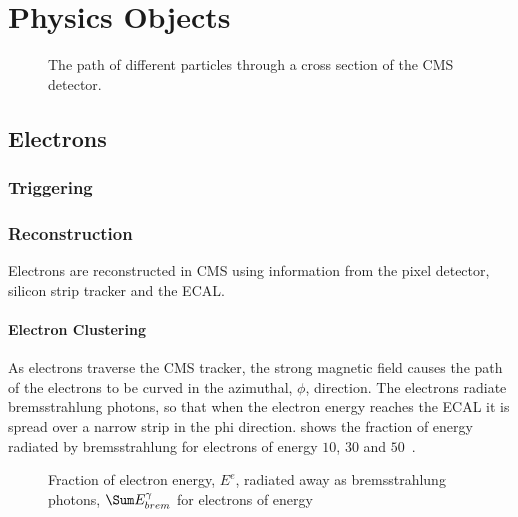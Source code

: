 \chapter{Physics Objects}


\begin{figure}[htb]
  \centering
  \caption{The path of different particles through a cross section of the CMS detector.}
  \label{phob:crosssec}
\end{figure}

\section{Electrons}

\subsection{Triggering}

\subsection{Reconstruction}
Electrons are reconstructed in CMS using information from the pixel detector,
silicon strip tracker and the ECAL.

\subsubsection{Electron Clustering}
As electrons traverse the CMS tracker, the strong magnetic field causes the path
of the electrons to be curved in the azimuthal, $\phi$, direction. The electrons
radiate bremsstrahlung photons, so that when the electron energy reaches the
ECAL it is spread over a narrow strip in the phi direction.
 shows the fraction of energy radiated by bremsstrahlung for
electrons of energy $10$, $30$ and \unit{$50$}{\GeV}.

\begin{figure}[htb]
  \centering
  \caption{Fraction of electron energy, $E^{e}$, radiated away as bremsstrahlung
photons, $\Sum E_{brem}^{\gamma}$ for electrons of energy }%
  \label{reco:brem}
\end{figure}

